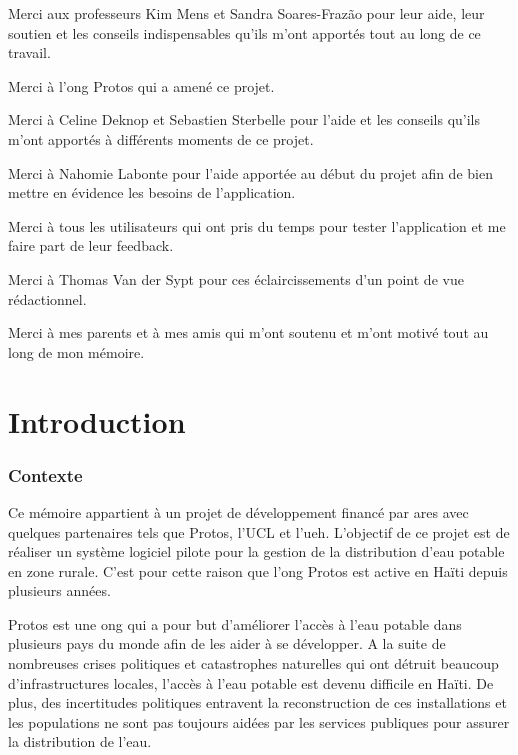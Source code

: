 \documentclass{EPL-master-thesis-covers-FR}
\begin{document}
		Merci aux professeurs Kim Mens et Sandra Soares-Frazão pour leur aide, leur soutien et les conseils indispensables qu'ils m'ont apportés tout au long de ce travail.
		
		Merci à l'\gls{ong} Protos qui a amené ce projet.
		
		Merci à Celine Deknop et Sebastien Sterbelle pour l'aide et les conseils qu'ils m'ont apportés à différents moments de ce projet.
		
		Merci à Nahomie Labonte pour l'aide apportée au début du projet afin de bien mettre en évidence les besoins de l'application.
		
		Merci à tous les utilisateurs qui ont pris du temps pour tester l'application et me faire part de leur feedback.
		
		Merci à Thomas Van der Sypt pour ces éclaircissements d'un point de vue rédactionnel.
				
		Merci à mes parents et à mes amis qui m'ont soutenu et m'ont motivé tout au long de mon mémoire.

		

	\printnoidxglossary[title=Glossaire, toctitle=Glossaire]
	\glsaddall

	\chapter{Introduction}

		
		\subsection*{Contexte}
		
			Ce mémoire appartient à un projet de développement financé par \gls{ares} avec quelques partenaires tels que Protos, l'UCL et l'\gls{ueh}. L'objectif de ce projet est de réaliser un système logiciel pilote pour la gestion de la distribution d'eau potable en zone rurale. C'est pour cette raison que l'\gls{ong} Protos est active en Haïti depuis plusieurs années.
			
			Protos est une \gls{ong} qui a pour but d'améliorer l'accès à l'eau potable dans plusieurs pays du monde afin de les aider à se développer. A la suite de nombreuses crises politiques et catastrophes naturelles qui ont détruit beaucoup d'infrastructures locales, l'accès à l'eau potable est devenu difficile en Haïti. De plus, des incertitudes politiques entravent la reconstruction de ces installations et les populations ne sont pas toujours aidées par les services publiques pour assurer la distribution de l'eau. 
			
\end{document}

